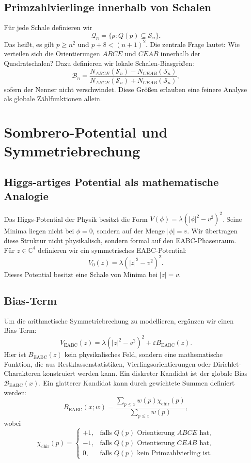 \documentclass[11pt,a4paper,bibliography=totoc]{scrartcl}
\begin{document}
	\subsection{Primzahlvierlinge innerhalb von Schalen}
	Für jede Schale definieren wir
	\[
	\mathcal{Q}_n = \{p : Q(p) \subseteq \mathcal{S}_n\}.
	\]
	Das heißt, es gilt $p \geq n^2$ und $p+8 < (n+1)^2$. Die zentrale Frage lautet: Wie verteilen sich die Orientierungen $ABCE$ und $CEAB$ innerhalb der Quadratschalen? Dazu definieren wir lokale Schalen-Biasgrößen:
	\[
	\mathcal{B}_n = \frac{N_{ABCE}(\mathcal{S}_n) - N_{CEAB}(\mathcal{S}_n)}{N_{ABCE}(\mathcal{S}_n) + N_{CEAB}(\mathcal{S}_n)},
	\]
	sofern der Nenner nicht verschwindet. Diese Größen erlauben eine feinere Analyse als globale Zählfunktionen allein.
	
	\section{Sombrero-Potential und Symmetriebrechung}
	
	\subsection{Higgs-artiges Potential als mathematische Analogie}
	Das Higgs-Potential der Physik besitzt die Form $V(\phi) = \lambda \left(|\phi|^2 - v^2\right)^2$. Seine Minima liegen nicht bei $\phi = 0$, sondern auf der Menge $|\phi| = v$. Wir übertragen diese Struktur nicht physikalisch, sondern formal auf den EABC-Phasenraum. Für $z \in \mathbb{C}^4$ definieren wir ein symmetrisches EABC-Potential:
	\[
	V_0(z) = \lambda \left(|z|^2 - v^2\right)^2.
	\]
	Dieses Potential besitzt eine Schale von Minima bei $|z| = v$.
	
	\subsection{Bias-Term}
	Um die arithmetische Symmetriebrechung zu modellieren, ergänzen wir einen Bias-Term:
	\[
	V_{\mathrm{EABC}}(z) = \lambda \left(|z|^2 - v^2\right)^2 + \varepsilon B_{\mathrm{EABC}}(z).
	\]
	Hier ist $B_{\mathrm{EABC}}(z)$ kein physikalisches Feld, sondern eine mathematische Funktion, die aus Restklassenstatistiken, Vierlingsorientierungen oder Dirichlet-Charakteren konstruiert werden kann. Ein diskreter Kandidat ist der globale Bias $\mathcal{B}_{\mathrm{EABC}}(x)$. Ein glatterer Kandidat kann durch gewichtete Summen definiert werden:
	\[
	B_{\mathrm{EABC}}(x; w) = \frac{\sum_{p \leq x} w(p)\chi_{\mathrm{chir}}(p)}{\sum_{p \leq x} w(p)},
	\]
	wobei
	\[
	\chi_{\mathrm{chir}}(p) = 
	\begin{cases}
		+1, & \text{falls } Q(p) \text{ Orientierung } ABCE \text{ hat}, \\
		-1, & \text{falls } Q(p) \text{ Orientierung } CEAB \text{ hat}, \\
		0,  & \text{falls } Q(p) \text{ kein Primzahlvierling ist}.
	\end{cases}
	\]
	
\end{document}
